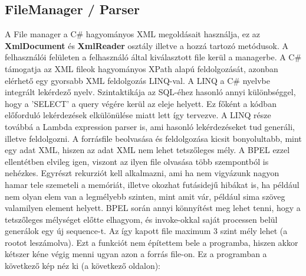 \subsection{FileManager / Parser }
A File manager a C\# hagyományos XML megoldásait használja, ez az \textbf{XmlDocument} és \textbf{XmlReader} osztály illetve a hozzá tartozó metódusok. A felhasználói felületen a felhasználó által kiválasztott file kerül a managerbe. A C\# támogatja az XML fileok hagyományos XPath alapú feldolgozását, azonban elérhető egy gyorsabb XML feldolgozás LINQ-val. A LINQ a C\# nyelvbe integrált lekérdező nyelv. Szintaktikája az SQL-éhez hasonló annyi különbséggel, hogy a 'SELECT' a query végére kerül az eleje helyett. Ez főként a kódban előforduló lekérdezések elkülönülése miatt lett így tervezve. A LINQ része továbbá a Lambda expression parser is, ami hasonló lekérdezéseket tud generáli, illetve feldolgozni. 
A forrásfile beolvasása és feldolgozása kicsit bonyolultabb, mint egy adat XML, hiszen az adat XML nem lehet tetszőleges mély. A BPEL ezzel ellentétben elvileg igen, viszont az ilyen file olvasása több szempontból is nehézkes. Egyrészt rekurziót kell alkalmazni, ami ha nem vigyázunk nagyon hamar tele szemeteli a memóriát, illetve okozhat futásidejű hibákat is, ha például nem olyan elem van a legmélyebb szinten, mint amit vár, például sima szöveg valamilyen element helyett. BPEL során annyi könnyítést meg lehet tenni, hogy a tetszőleges mélységet előtte elhagyom, és invoke-okkal saját processen belül generálok egy új sequence-t. Az így kapott file maximum 3 szint mély lehet (a rootot leszámolva). Ezt a funkciót nem építettem bele a programba, hiszen akkor kétszer kéne végig menni ugyan azon a forrás file-on.
Ez a programban a következő kép néz ki (a következő oldalon):
\newpage
